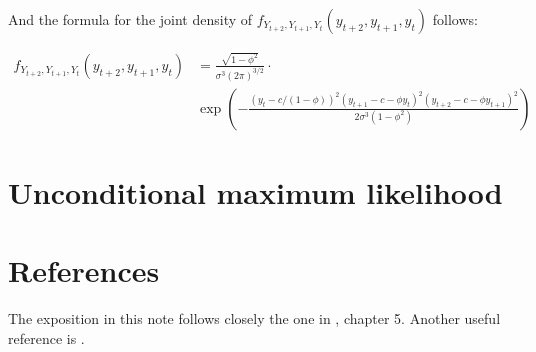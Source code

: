 \documentclass[12pt]{article}
\begin{document}
And the formula for the joint density of $f_{Y_{t+2}, Y_{t+1}, Y_t} (y_{t+2}, y_{t+1},
 y_t)$ follows:

\begin{eqnarray*}
\label{threevariate_density}
f_{Y_{t+2}, Y_{t+1}, Y_t} (y_{t+2}, y_{t+1}, y_t)& =
\frac{\sqrt{1 - \phi^2}}{\sigma^3 (2 \pi)^{3/2}} \cdot \\
& \exp \left(
-\frac{(y_t - c/(1-\phi))^2
(y_{t+1} - c - \phi y_t)^2
(y_{t+2} - c - \phi y_{t+1})^2}
{2\sigma^3(1- \phi^2)} 
\right)
\end{eqnarray*}

\section{Unconditional maximum likelihood}


\section{References}
The exposition in this note follows closely the one in \cite{hamilton_tsa}, chapter 5. 
Another useful reference is \cite{fuller_intro_tsa}.



\end{document}
